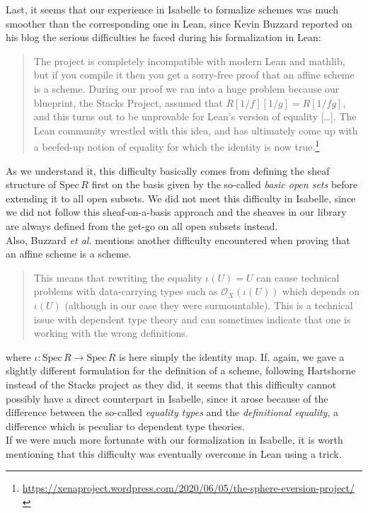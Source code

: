 \documentclass[12pt]{scrartcl}
\def\spec{\text{Spec}\,R}
\begin{document}
Last, it seems that our experience in Isabelle to formalize schemes was much smoother than the corresponding one in Lean, since Kevin Buzzard reported on his blog the serious difficulties he faced during his formalization in Lean:
\begin{quote}
	The project is completely incompatible with modern Lean and mathlib, but if you compile it then you get a sorry-free proof that an affine scheme is a scheme. During our proof we ran into a huge problem because our blueprint, the Stacks Project, assumed that $R[1/f][1/g]=R[1/fg]$, and this turns out to be unprovable for Lean’s version of equality [\dots]. The Lean community wrestled with this idea, and has ultimately come up with a beefed-up notion of equality for which the identity is now true.\footnote{\url{https://xenaproject.wordpress.com/2020/06/05/the-sphere-eversion-project/}}
\end{quote}	
As we understand it, this difficulty basically comes from defining the sheaf structure of $\spec$ first on the basis given by the so-called \textit{basic open sets} before extending it to all open subsets. We did not meet this difficulty in Isabelle, since we did not follow this sheaf-on-a-basis approach and the sheaves in our library are always defined from the get-go on all open subsets instead. \\
Also, Buzzard \textit{et al.} mentions another difficulty encountered when proving that an affine scheme is a scheme. 
\begin{quote}
	This means that rewriting the equality $\iota(U) = U$ can cause technical problems with data-carrying types such as $\mathscr{O}_X(\iota(U))$ which depends on $\iota(U)$ (although in our case they were surmountable). This is a technical issue with dependent type theory and can sometimes indicate that one is working with the wrong definitions. \cite[3.5]{schemesinLean}
\end{quote}	
where $\iota: \spec \rightarrow \spec$ is here simply the identity map. If, again, we gave a slightly different formulation for the definition of a scheme, following Hartshorne~\cite{hartshorne} instead of the Stacks project \cite{stacksproject} as they did, it seems that this difficulty cannot possibly have a direct counterpart in Isabelle, since it arose because of the difference between the so-called \textit{equality types} and the \textit{definitional equality}, a difference which is peculiar to dependent type theories. \\
If we were much more fortunate with our formalization in Isabelle, it is worth mentioning that this difficulty was eventually overcome in Lean using a trick.  
\end{document}
